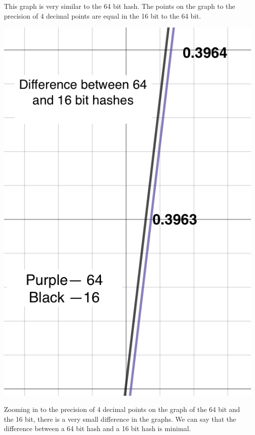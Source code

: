 \documentclass[11pt, solution, letterpaper]{format}
\begin{document}
This graph is very similar to the 64 bit hash. The points on the graph to the precision of 4 decimal points are equal in the 16 bit to the 64 bit. \\
\begin{center}\includegraphics[scale=.5]{16-64.png}\end{center}

Zooming in to the precision of 4 decimal points on the graph of the 64 bit and the 16 bit, there is a very small difference in the graphs. We can say that the difference between a 64 bit hash and a 16 bit hash is minimal.
\end{document}
